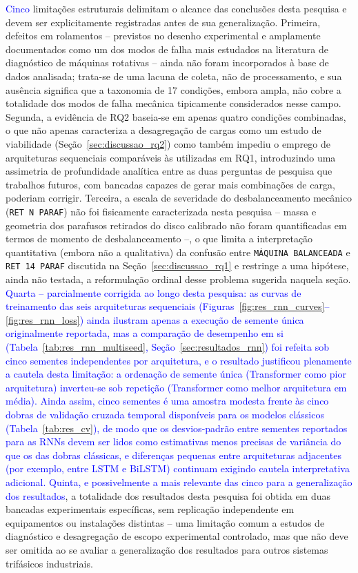 \documentclass[times,final]{elsarticle}
\begin{document}
\textcolor{blue}{Cinco} limitações estruturais delimitam o alcance das conclusões desta pesquisa e devem ser explicitamente registradas antes de sua generalização. Primeira, defeitos em rolamentos -- previstos no desenho experimental e amplamente documentados como um dos modos de falha mais estudados na literatura de diagnóstico de máquinas rotativas \citep{hoang2019} -- ainda não foram incorporados à base de dados analisada; trata-se de uma lacuna de coleta, não de processamento, e sua ausência significa que a taxonomia de 17 condições, embora ampla, não cobre a totalidade dos modos de falha mecânica tipicamente considerados nesse campo. Segunda, a evidência de RQ2 baseia-se em apenas quatro condições combinadas, o que não apenas caracteriza a desagregação de cargas como um estudo de viabilidade (Seção~\ref{sec:discussao_rq2}) como também impediu o emprego de arquiteturas sequenciais comparáveis às utilizadas em RQ1, introduzindo uma assimetria de profundidade analítica entre as duas perguntas de pesquisa que trabalhos futuros, com bancadas capazes de gerar mais combinações de carga, poderiam corrigir. Terceira, a escala de severidade do desbalanceamento mecânico (\texttt{RET~N~PARAF}) não foi fisicamente caracterizada nesta pesquisa -- massa e geometria dos parafusos retirados do disco calibrado não foram quantificadas em termos de momento de desbalanceamento --, o que limita a interpretação quantitativa (embora não a qualitativa) da confusão entre \texttt{MÁQUINA BALANCEADA} e \texttt{RET~14~PARAF} discutida na Seção~\ref{sec:discussao_rq1} e restringe a uma hipótese, ainda não testada, a reformulação ordinal desse problema sugerida naquela seção. \textcolor{blue}{Quarta -- parcialmente corrigida ao longo desta pesquisa: as curvas de treinamento das seis arquiteturas sequenciais (Figuras~\ref{fig:res_rnn_curves}--\ref{fig:res_rnn_loss}) ainda ilustram apenas a execução de semente única originalmente reportada, mas a comparação de desempenho em si (Tabela~\ref{tab:res_rnn_multiseed}, Seção~\ref{sec:resultados_rnn}) foi refeita sob cinco sementes independentes por arquitetura, e o resultado justificou plenamente a cautela desta limitação: a ordenação de semente única (Transformer como pior arquitetura) inverteu-se sob repetição (Transformer como melhor arquitetura em média). Ainda assim, cinco sementes é uma amostra modesta frente às cinco dobras de validação cruzada temporal disponíveis para os modelos clássicos (Tabela~\ref{tab:res_cv}), de modo que os desvios-padrão entre sementes reportados para as RNNs devem ser lidos como estimativas menos precisas de variância do que os das dobras clássicas, e diferenças pequenas entre arquiteturas adjacentes (por exemplo, entre LSTM e BiLSTM) continuam exigindo cautela interpretativa adicional.} \textcolor{blue}{Quinta, e possivelmente a mais relevante das cinco para a generalização dos resultados}, a totalidade dos resultados desta pesquisa foi obtida em duas bancadas experimentais específicas, sem replicação independente em equipamentos ou instalações distintas -- uma limitação comum a estudos de diagnóstico e desagregação de escopo experimental controlado, mas que não deve ser omitida ao se avaliar a generalização dos resultados para outros sistemas trifásicos industriais.
\end{document}
